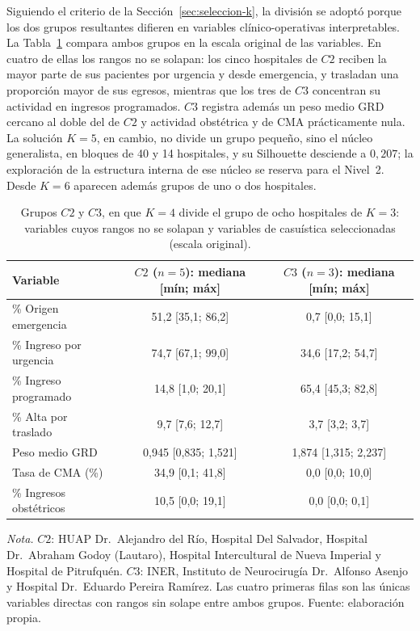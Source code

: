Siguiendo el criterio de la Sección~\ref{sec:seleccion-k}, la división se
adoptó porque los dos grupos resultantes difieren en variables
clínico-operativas interpretables. La Tabla~\ref{tab:c2-c3} compara ambos
grupos en la escala original de las variables. En cuatro de ellas los rangos
no se solapan: los cinco hospitales de $C2$ reciben la mayor parte de sus
pacientes por urgencia y desde emergencia, y trasladan una proporción mayor de
sus egresos, mientras que los tres de $C3$ concentran su actividad en ingresos
programados. $C3$ registra además un peso medio GRD cercano al doble del de $C2$
y actividad obstétrica y de CMA prácticamente nula. La solución $K=5$, en
cambio, no divide un grupo pequeño, sino el núcleo generalista, en bloques de 40
y 14 hospitales, y su Silhouette desciende a $0{,}207$; la exploración de la
estructura interna de ese núcleo se reserva para el Nivel~2. Desde $K=6$
aparecen además grupos de uno o dos hospitales.

\begin{table}[htbp]
\centering
\caption{Grupos $C2$ y $C3$, en que $K=4$ divide el grupo de ocho hospitales de $K=3$: variables cuyos rangos no se solapan y variables de casuística seleccionadas (escala original).}
\label{tab:c2-c3}
\begin{tabular}{l c c}
\toprule
\textbf{Variable} & \textbf{$C2$ ($n=5$): mediana [mín; máx]} &
\textbf{$C3$ ($n=3$): mediana [mín; máx]} \\
\midrule
\% Origen emergencia & 51,2 [35,1; 86,2] & 0,7 [0,0; 15,1] \\
\% Ingreso por urgencia & 74,7 [67,1; 99,0] & 34,6 [17,2; 54,7] \\
\% Ingreso programado & 14,8 [1,0; 20,1] & 65,4 [45,3; 82,8] \\
\% Alta por traslado & 9,7 [7,6; 12,7] & 3,7 [3,2; 3,7] \\
\addlinespace
Peso medio GRD & 0,945 [0,835; 1,521] & 1,874 [1,315; 2,237] \\
Tasa de CMA (\%) & 34,9 [0,1; 41,8] & 0,0 [0,0; 10,0] \\
\% Ingresos obstétricos & 10,5 [0,0; 19,1] & 0,0 [0,0; 0,1] \\
\bottomrule
\end{tabular}
\par\smallskip
\begin{minipage}{\textwidth}
\normalsize\raggedright
\textit{Nota.} $C2$: HUAP Dr.\ Alejandro del Río, Hospital Del Salvador,
Hospital Dr.\ Abraham Godoy (Lautaro), Hospital Intercultural de Nueva Imperial
y Hospital de Pitrufquén. $C3$: INER, Instituto de Neurocirugía Dr.\ Alfonso
Asenjo y Hospital Dr.\ Eduardo Pereira Ramírez. Las cuatro primeras filas son
las únicas variables directas con rangos sin solape entre ambos grupos. Fuente:
elaboración propia.
\end{minipage}
\end{table}

